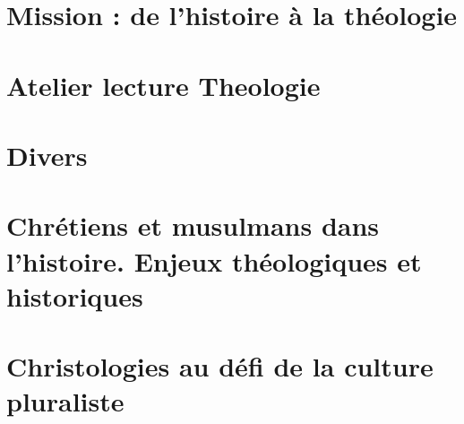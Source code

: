 \documentclass[oneside,10pt]{book}
\begin{document}
  \part{Mission : de l'histoire à la théologie}
 
 
  
 
 
 
  
  
  
 
 


% 
 
 
 
  \part{Atelier lecture Theologie}
 
 
 
  
  
    
  
 

 
 
 
 \part{Divers}





 \part{Chrétiens et musulmans dans l'histoire. Enjeux théologiques et historiques}





%
 
\part{Christologies au défi de la culture pluraliste}


%

\printbibliography

%
\end{document}
